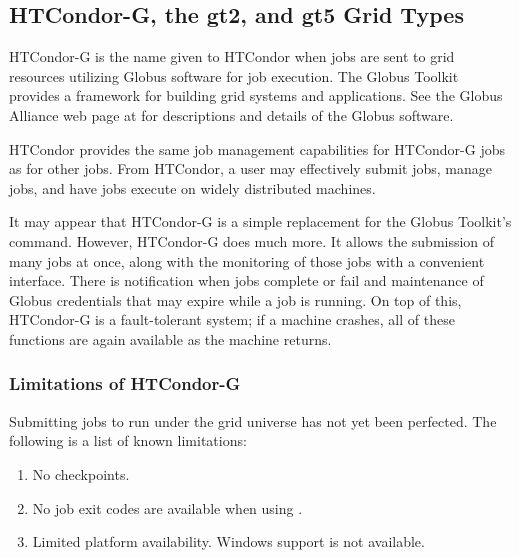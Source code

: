
\subsection{\label{sec:HTCondor-G}HTCondor-G, the gt2, and gt5 Grid Types}

HTCondor-G is the name given to HTCondor when 
 jobs are sent to grid resources utilizing
Globus software for job execution.
The Globus Toolkit provides a framework for building grid systems
and applications.
See the Globus Alliance web page at
for descriptions and details of the Globus software.

HTCondor provides the same job management capabilities for HTCondor-G
jobs as for other jobs.
From HTCondor, a user may effectively submit jobs, manage jobs,
and have jobs execute on widely distributed machines.

It may appear that HTCondor-G is a simple replacement
for the Globus Toolkit's  command.
However, HTCondor-G does much more.
It allows the submission of many jobs at once,
along with the monitoring of those jobs with a convenient interface.
There is notification when jobs complete or fail
and maintenance of Globus credentials
that may expire while a job is running.
On top of this, HTCondor-G is a fault-tolerant system;
if a machine crashes,
all of these functions are again available as the machine returns.









\subsubsection{\label{sec:HTCondor-G-Limits}Limitations of HTCondor-G}
Submitting jobs to run under the grid universe has not yet
been perfected.
The following is a list of known limitations:

\begin{enumerate}
\item{No checkpoints.}
\item{No job exit codes are available when using .  }
\item{Limited platform availability.  Windows support is not available.  }
\end{enumerate}



